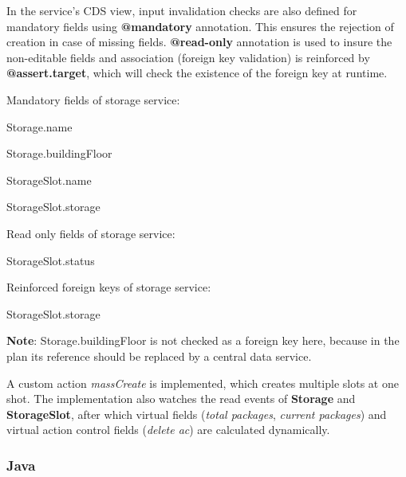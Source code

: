 \bigskip
In the service's CDS view, input invalidation checks are also defined for mandatory fields using \textbf{@mandatory} annotation. This ensures the rejection of creation in case of missing fields. \textbf{@read-only} annotation is used to insure the non-editable fields and association (foreign key validation) is reinforced by \textbf{@assert.target}, which will check the existence of the foreign key at runtime.

\bigskip
Mandatory fields of storage service:
\begin{compactenum}
	\item Storage.name
    \item Storage.buildingFloor
    \item StorageSlot.name
    \item StorageSlot.storage
\end{compactenum}

\bigskip
Read only fields of storage service:
\begin{compactenum}
	\item StorageSlot.status
\end{compactenum}

\bigskip
Reinforced foreign keys of storage service:
\begin{compactenum}
	\item StorageSlot.storage
\end{compactenum}

\bigskip
\textbf{Note}: Storage.buildingFloor is not checked as a foreign key here, because in the plan its reference should be replaced by a central data service.


A custom action \textit{massCreate} is implemented, which creates multiple slots at one shot. The implementation also watches the read events of \textbf{Storage} and \textbf{StorageSlot}, after which virtual fields (\textit{total packages}, \textit{current packages}) and virtual action control fields (\textit{delete ac}) are calculated dynamically.

\subsubsection{Java}

